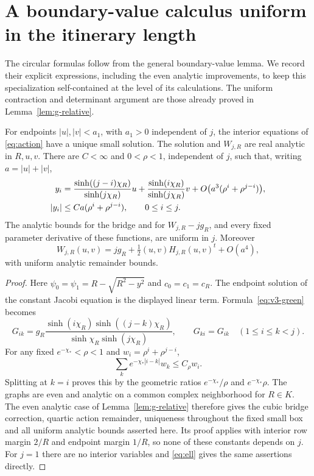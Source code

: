 \section{A boundary-value calculus uniform in the itinerary length}
\label{sec:action}
The circular formulas follow from the general boundary-value lemma.
We record their explicit expressions, including the even analytic
improvements, to keep this specialization self-contained at the level
of its calculations. The uniform contraction and determinant argument
are those already proved in Lemma~\ref{lem:g-relative}.

\begin{lemma}\label{lem:bridge}
For endpoints $|u|,|v|<a_1$, with $a_1>0$ independent of $j$, the
interior equations of \eqref{eq:action} have a unique small solution.
The solution and $W_{j,R}$ are real analytic in $R,u,v$. There are
$C<\infty$ and $0<\rho<1$, independent of $j$, such that, writing
$a=|u|+|v|$,
\begin{align}\label{eq:bridge-estimates}
 y_i&=\frac{\sinh((j-i)\chi_R)}{\sinh(j\chi_R)}u
       +\frac{\sinh(i\chi_R)}{\sinh(j\chi_R)}v
       +O\bigl(a^3(\rho^i+\rho^{j-i})\bigr),\\
 |y_i|&\le Ca(\rho^i+\rho^{j-i}),\qquad 0\le i\le j.\notag
\end{align}
The analytic bounds for the bridge and for $W_{j,R}-jg_R$, and
every fixed parameter derivative of these functions, are uniform in $j$. Moreover
\begin{equation}\label{eq:action-jet}
 W_{j,R}(u,v)=jg_R+\tfrac12(u,v)H_{j,R}(u,v)^t+O(a^4),
\end{equation}
with uniform analytic remainder bounds.
\end{lemma}
\begin{proof}
Here $\psi_0=\psi_1=R-\sqrt{R^2-y^2}$ and
$c_0=c_1=c_R$. The endpoint solution of the constant Jacobi equation
is the displayed linear term. Formula~\eqref{eq:v3-green} becomes
\begin{equation}\label{eq:green}
 G_{ik}=g_R\frac{\sinh(i\chi_R)\sinh((j-k)\chi_R)}
                    {\sinh\chi_R\sinh(j\chi_R)},\qquad G_{ki}=G_{ik}
 \quad(1\le i\le k<j).
\end{equation}
For any fixed $e^{-\chi_*}<\rho<1$ and $w_i=\rho^i+\rho^{j-i}$,
\begin{equation}\label{eq:weighted-green}
 \sum_k e^{-\chi_*|i-k|}w_k\le C_\rho w_i.
\end{equation}
Splitting at $k=i$ proves this by the geometric ratios
$e^{-\chi_*}/\rho$ and $e^{-\chi_*}\rho$.
The graphs are even and analytic on a common complex neighborhood
for $R\in K$. The even analytic case of Lemma~\ref{lem:g-relative}
therefore gives the cubic bridge correction, quartic action remainder,
uniqueness throughout the fixed small box and all uniform analytic
bounds asserted here. Its proof applies with interior row margin
$2/R$ and endpoint margin $1/R$, so none of these constants depends
on $j$. For $j=1$ there are no interior variables and
\eqref{eq:ell} gives the same assertions directly.
\end{proof}


